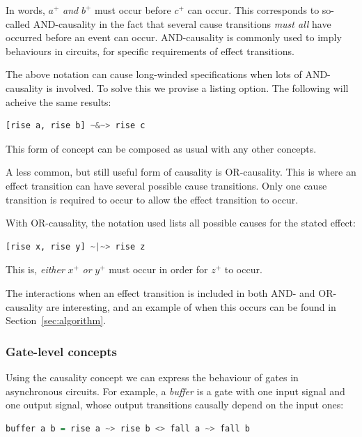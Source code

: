 \documentclass[british,conference,compsoc]{IEEEtran}
\begin{document}
In words, $a^{+}$ \emph{and} $b^{+}$ must occur before $c^{+}$ can occur. 
This corresponds to so-called AND-causality in the fact that several cause 
transitions \emph{must all} have occurred before an event can occur. 
AND-causality is commonly used to imply behaviours in circuits, for specific 
requirements of effect transitions.  

The above notation can cause long-winded specifications when lots of 
AND-causality is involved. To solve this we provise a listing option. The 
following will acheive the same results:

\begin{lstlisting}[language=haskell]
            [rise a, rise b] ~&~> rise c
\end{lstlisting}

This form of concept can be composed as usual with any other concepts.

A less common, but still useful form of causality is OR-causality. This is 
where an effect transition can have several possible cause transitions. Only 
one cause transition is required to occur to allow the effect transition to 
occur. 

With OR-causality, the notation used lists all possible causes for the stated 
effect:

\begin{lstlisting}[language=haskell]
            [rise x, rise y] ~|~> rise z
\end{lstlisting}

This is, \emph{either} $x^{+}$ \emph{or} $y^{+}$ must occur in order for 
$z^{+}$ to occur.

The interactions when an effect transition is included in both AND- and 
OR-causality are interesting, and an example of when this occurs can be found 
in Section~\ref{sec:algorithm}.

\vspace{-2mm}

\subsubsection{Gate-level concepts} Using the causality concept we can express
the behaviour of gates in asynchronous circuits. For example, a \emph{buffer}
is a gate with one input signal and one output signal,
whose output transitions causally depend on the input ones:

\begin{lstlisting}[language=haskell]
buffer a b = rise a ~> rise b <> fall a ~> fall b
\end{lstlisting}
\end{document}
